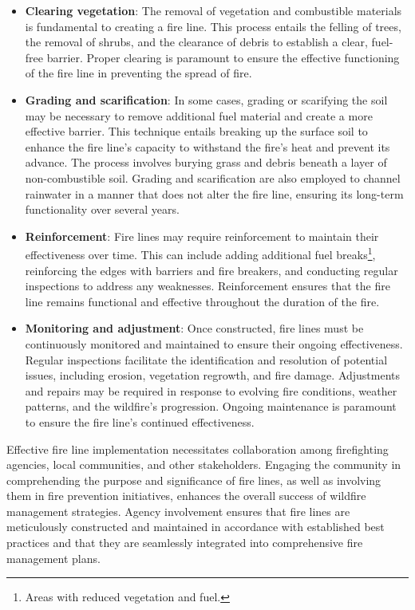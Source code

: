 \documentclass[
  12 pt,
]{Nemilov}
\begin{document}
\begin{itemize}
\item
  \textbf{Clearing vegetation}: The removal of vegetation and combustible materials is fundamental to creating a fire line. This process entails the felling of trees, the removal of shrubs, and the clearance of debris to establish a clear, fuel-free barrier. Proper clearing is paramount to ensure the effective functioning of the fire line in preventing the spread of fire.
\item
  \textbf{Grading and scarification}: In some cases, grading or scarifying the soil may be necessary to remove additional fuel material and create a more effective barrier. This technique entails breaking up the surface soil to enhance the fire line's capacity to withstand the fire's heat and prevent its advance. The process involves burying grass and debris beneath a layer of non-combustible soil. Grading and scarification are also employed to channel rainwater in a manner that does not alter the fire line, ensuring its long-term functionality over several years.
\item
  \textbf{Reinforcement}: Fire lines may require reinforcement to maintain their effectiveness over time. This can include adding additional fuel breaks\footnote{Areas with reduced vegetation and fuel.}, reinforcing the edges with barriers and fire breakers, and conducting regular inspections to address any weaknesses. Reinforcement ensures that the fire line remains functional and effective throughout the duration of the fire.
\item
  \textbf{Monitoring and adjustment}: Once constructed, fire lines must be continuously monitored and maintained to ensure their ongoing effectiveness. Regular inspections facilitate the identification and resolution of potential issues, including erosion, vegetation regrowth, and fire damage. Adjustments and repairs may be required in response to evolving fire conditions, weather patterns, and the wildfire's progression. Ongoing maintenance is paramount to ensure the fire line's continued effectiveness.
\end{itemize}

Effective fire line implementation necessitates collaboration among firefighting agencies, local communities, and other stakeholders. Engaging the community in comprehending the purpose and significance of fire lines, as well as involving them in fire prevention initiatives, enhances the overall success of wildfire management strategies. Agency involvement ensures that fire lines are meticulously constructed and maintained in accordance with established best practices and that they are seamlessly integrated into comprehensive fire management plans.
\end{document}

